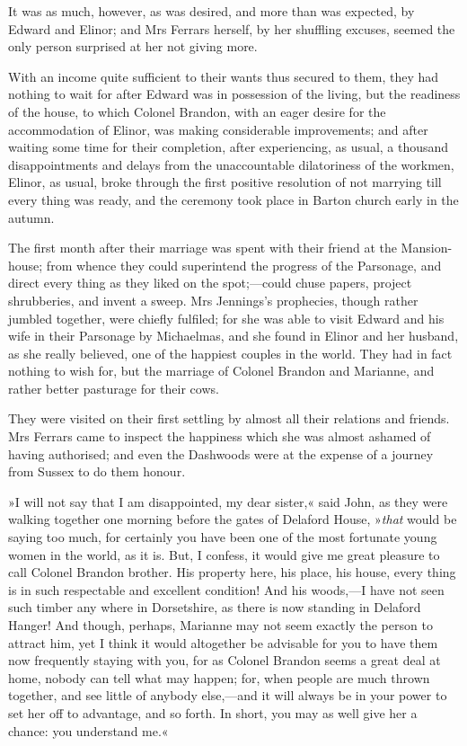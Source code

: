 It was as much, however, as was desired, and more than was expected, by Edward and Elinor; and Mrs Ferrars herself, by her shuffling excuses, seemed the only person surprised at her not giving more.

With an income quite sufficient to their wants thus secured to them, they had nothing to wait for after Edward was in possession of the living, but the readiness of the house, to which Colonel Brandon, with an eager desire for the accommodation of Elinor, was making considerable improvements; and after waiting some time for their completion, after experiencing, as usual, a thousand disappointments and delays from the unaccountable dilatoriness of the workmen, Elinor, as usual, broke through the first positive resolution of not marrying till every thing was ready, and the ceremony took place in Barton church early in the autumn.

The first month after their marriage was spent with their friend at the Mansion-house; from whence they could superintend the progress of the Parsonage, and direct every thing as they liked on the spot;—could chuse papers, project shrubberies, and invent a sweep. Mrs Jennings’s prophecies, though rather jumbled together, were chiefly fulfiled; for she was able to visit Edward and his wife in their Parsonage by Michaelmas, and she found in Elinor and her husband, as she really believed, one of the happiest couples in the world. They had in fact nothing to wish for, but the marriage of Colonel Brandon and Marianne, and rather better pasturage for their cows.

They were visited on their first settling by almost all their relations and friends. Mrs Ferrars came to inspect the happiness which she was almost ashamed of having authorised; and even the Dashwoods were at the expense of a journey from Sussex to do them honour.

»I will not say that I am disappointed, my dear sister,« said John, as they were walking together one morning before the gates of Delaford House, »\textit{that} would be saying too much, for certainly you have been one of the most fortunate young women in the world, as it is. But, I confess, it would give me great pleasure to call Colonel Brandon brother. His property here, his place, his house, every thing is in such respectable and excellent condition! And his woods,—I have not seen such timber any where in Dorsetshire, as there is now standing in Delaford Hanger! And though, perhaps, Marianne may not seem exactly the person to attract him, yet I think it would altogether be advisable for you to have them now frequently staying with you, for as Colonel Brandon seems a great deal at home, nobody can tell what may happen; for, when people are much thrown together, and see little of anybody else,—and it will always be in your power to set her off to advantage, and so forth. In short, you may as well give her a chance: you understand me.«

